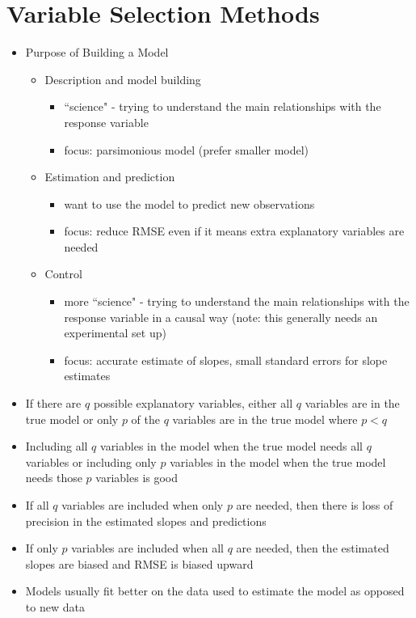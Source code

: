 \documentclass[12pt]{article}
\begin{document}
\section{Variable Selection Methods}
\begin{itemize}
\item Purpose of Building a Model \begin{itemize} 
\item Description and model building \begin{itemize}
\item ``science" - trying to understand the main relationships with the response variable 
\item focus: parsimonious model (prefer smaller model) \end{itemize} 
\item Estimation and prediction \begin{itemize} 
\item want to use the model to predict new observations 
\item focus: reduce RMSE even if it means extra explanatory variables are needed 
\end{itemize} 
\item Control \begin{itemize} 
\item more ``science" - trying to understand the main relationships with the response variable in a causal way (note: this generally needs an experimental set up)
\item focus: accurate estimate of slopes, small standard errors for slope estimates \end{itemize} \end{itemize}
\item If there are $q$ possible explanatory variables, either all $q$ variables are in the true model or only $p$ of the $q$ variables are in the true model where $p < q$ 
\item Including all $q$ variables in the model when the true model needs all $q$ variables or including only $p$ variables in the model when the true model needs those $p$ variables is good 
\item If all $q$ variables are included when only $p$ are needed, then there is loss of precision in the estimated slopes and predictions 
\item If only $p$ variables are included when all $q$ are needed, then the estimated slopes are biased and RMSE is biased upward 
\item Models usually fit better on the data used to estimate the model as opposed to new data 

\end{itemize}
\end{document}

